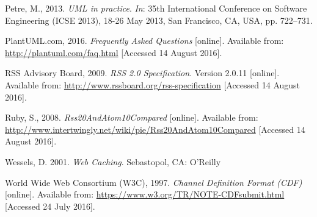 \documentclass[a4paper]{article}
\begin{document}
\begin{thebibliography}{9}
Petre, M., 2013.
\textit{UML in practice}. \textit{In}: 35th International Conference on Software Engineering (ICSE 2013), 18-26 May 2013, San Francisco, CA, USA, pp. 722–731.

PlantUML.com, 2016.
\textit{Frequently Asked Questions} [online].
Available from: \url{http://plantuml.com/faq.html} [Accessed 14 August 2016].

RSS Advisory Board, 2009.
\textit{RSS 2.0 Specification}. Version 2.0.11 [online].
Available from: \url{http://www.rssboard.org/rss-specification} [Accessed 14 August 2016].

Ruby, S., 2008.
\textit{Rss20AndAtom10Compared} [online].
Available from: \url{http://www.intertwingly.net/wiki/pie/Rss20AndAtom10Compared} [Accessed 14 August 2016].

Wessels, D. 2001.
\textit{Web Caching}.
Sebastopol, CA: O'Reilly

World Wide Web Consortium (W3C), 1997.
\textit{Channel Definition Format (CDF)} [online].
Available from: \url{https://www.w3.org/TR/NOTE-CDFsubmit.html}
[Accessed 24 July 2016].

\end{thebibliography}
\end{document}
